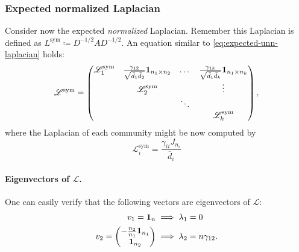 \documentclass[../../main.tex]{subfiles} %
\begin{document}
\subsubsection{Expected normalized Laplacian}
Consider now the expected \textit{normalized} Laplacian. Remember this 
Laplacian is defined as \(L^{\text{sym}} \coloneqq D^{-1/2} A D^{-1/2}\). An 
equation similar to \ref{eq:expected-unn-laplacian} holds:
\begin{dmath*} \label{eq:expected-norm-laplacian}
	\mathscr L^{\text{sym}} =
	\begin{pmatrix}
		\mathscr L_1^{\text{sym}} & \frac{\gamma_{12}}{\sqrt{\bar d_1 \bar 
		d_2}} \ones[n_1 \times n_2] & \dots & \frac{\gamma_{1k}}{\sqrt{\bar d_1 
		\bar d_k}} \ones[n_1 \times n_k] \\
		& \mathscr L_2^{\text{sym}} & & \vdots \\
		& & \ddots & \\
		& & & \mathscr L_k^{\text{sym}}
	\end{pmatrix},
\end{dmath*}
where the Laplacian of each community might be now computed by
\begin{equation*}
	\mathscr L_i^{\text{sym}} = \frac{\gamma_{ii} J_{n_i}}{\bar d_i}
\end{equation*}

\paragraph{Eigenvectors of \(\mathscr L\).} One can easily verify that the 
following vectors are eigenvectors of \(\mathscr L\):
\begin{align*}
		v_1 = \ones &\implies \lambda_1 = 0 \\
		v_2 = 
			\begin{pmatrix}
				-\frac{n_2}{n_1} \ones[n_1] \\
				\ones[n_2]
			\end{pmatrix} &\implies \lambda_2 = n \gamma_{12}.
\end{align*}
\\
\end{document}
